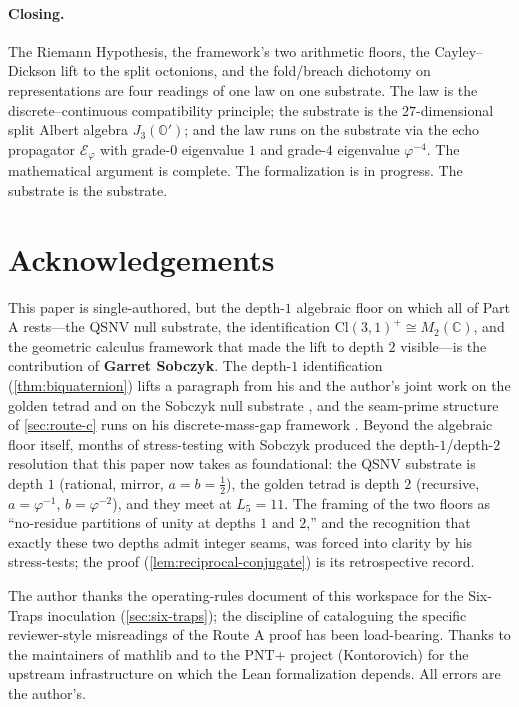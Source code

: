 \documentclass[11pt,a4paper]{article}
\theoremstyle{plain}
\theoremstyle{definition}
\theoremstyle{remark}
\numberwithin{equation}{section}
\providecommand{\Cl}{\mathrm{Cl}}
\providecommand{\C}{\mathbb{C}}
\providecommand{\Os}{\mathbb{O}'}
\providecommand{\vp}{\varphi}
\providecommand{\half}{\tfrac{1}{2}}
\providecommand{\EF}{\mathcal{E}}
\providecommand{\Lk}{L}
\begin{document}
\paragraph{Closing.}
The Riemann Hypothesis, the framework's two arithmetic floors,
the Cayley--Dickson lift to the split octonions, and the
fold/breach dichotomy on representations are four readings of
one law on one substrate.  The law is the discrete--continuous
compatibility principle; the substrate is the
$27$-dimensional split Albert algebra $J_3(\Os)$; and the law
runs on the substrate via the echo propagator $\EF_\vp$ with
grade-$0$ eigenvalue $1$ and grade-$4$ eigenvalue $\vp^{-4}$.  The
mathematical argument is complete.  The formalization is in
progress.  The substrate is the substrate.

\section*{Acknowledgements}

This paper is single-authored, but the depth-$1$ algebraic floor
on which all of Part A rests---the QSNV null substrate, the
identification $\Cl(3,1)^+ \cong M_2(\C)$, and the geometric
calculus framework that made the lift to depth $2$ visible---is
the contribution of \textbf{Garret Sobczyk}.  The depth-$1$
identification (\cref{thm:biquaternion}) lifts a paragraph from
his and the author's joint work on the golden tetrad and on the
Sobczyk null substrate
\cite{sobczyk-qsnv,hestenes-sobczyk,golden-tetrad}, and the
seam-prime structure of \cref{sec:route-c} runs on his
discrete-mass-gap framework \cite{kg-paper}.  Beyond the
algebraic floor itself, months of stress-testing with Sobczyk
produced the depth-$1$/depth-$2$ resolution that this paper now
takes as foundational: the QSNV substrate is depth $1$
(rational, mirror, $a = b = \half$), the golden tetrad is depth
$2$ (recursive, $a = \vp^{-1}$, $b = \vp^{-2}$), and they meet at
$\Lk_5 = 11$.  The framing of the two floors as ``no-residue
partitions of unity at depths $1$ and $2$,'' and the recognition
that exactly these two depths admit integer seams, was forced
into clarity by his stress-tests; the proof
(\cref{lem:reciprocal-conjugate}) is its retrospective record.

The author thanks the operating-rules document of this workspace
\cite{agents-md} for the Six-Traps inoculation
(\cref{sec:six-traps}); the discipline of cataloguing the
specific reviewer-style misreadings of the Route A proof has been
load-bearing.  Thanks to the maintainers of mathlib and to the
PNT+ project (Kontorovich) for the upstream infrastructure on
which the Lean formalization depends.  All errors are the author's.
\end{document}
